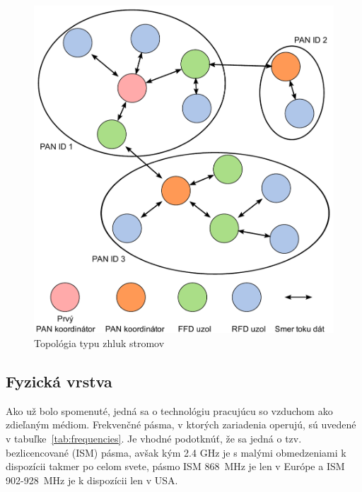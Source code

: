 \begin{figure}[htbp]
\begin{center}
\includegraphics[width=120mm]{figures/topology_cluster}
\caption{Topológia typu zhluk stromov}
\label{fig:topology_cluster}
\end{center}
\end{figure} 

\subsection{Fyzická vrstva}

\indent\indent Ako už bolo spomenuté, jedná sa o technológiu pracujúcu so vzduchom ako zdieľaným médiom. Frekvenčné pásma, v ktorých zariadenia operujú, sú uvedené v tabuľke~\ref{tab:frequencies}. Je vhodné podotknúť, že sa jedná o tzv. bezlicencované (ISM) pásma, avšak kým 2.4 GHz je s malými obmedzeniami k dispozícii takmer po celom svete, pásmo ISM 868~MHz je len v Európe a ISM 902-928~MHz je k dispozícii len v USA.\\

